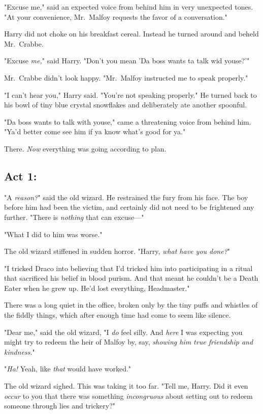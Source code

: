 "Excuse me," said an expected voice from behind him in very unexpected tones. 
"At your convenience, Mr.~Malfoy requests the favor of a conversation."

Harry did not choke on his breakfast cereal. Instead he turned around and 
beheld Mr.~Crabbe.

"Excuse \emph{me,}" said Harry. "Don't you mean 'Da boss wants ta talk wid 
youse?'"

Mr.~Crabbe didn't look happy. "Mr.~Malfoy instructed me to speak properly."

"I can't hear you," Harry said. "You're not speaking properly." He turned back 
to his bowl of tiny blue crystal snowflakes and deliberately ate another 
spoonful.

"Da boss wants to talk with youse," came a threatening voice from behind him. 
"Ya'd better come see him if ya know what's good for ya."

There. \emph{Now} everything was going according to plan.
\sbreak
\subsection{Act 1:}

"A \emph{reason?}" said the old wizard. He restrained the fury from his face. 
The boy before him had been the victim, and certainly did not need to be 
frightened any further. "There is \emph{nothing} that can excuse---"

"What I did to him was worse."

The old wizard stiffened in sudden horror. "Harry, \emph{what have you done?}"

"I tricked Draco into believing that I'd tricked him into participating in a 
ritual that sacrificed his belief in blood purism. And that meant he couldn't 
be a Death Eater when he grew up. He'd lost everything, Headmaster."

There was a long quiet in the office, broken only by the tiny puffs and 
whistles of the fiddly things, which after enough time had come to seem like 
silence.

"Dear me," said the old wizard, "I \emph{do} feel silly. And \emph{here} I was 
expecting you might try to redeem the heir of Malfoy by, say, \emph{showing him 
true friendship and kindness}."

"\emph{Ha!} Yeah, like \emph{that} would have worked."

The old wizard sighed. This was taking it too far. "Tell me, Harry. Did it even 
\emph{occur} to you that there was something \emph{incongruous} about setting 
out to redeem someone through lies and trickery?"

